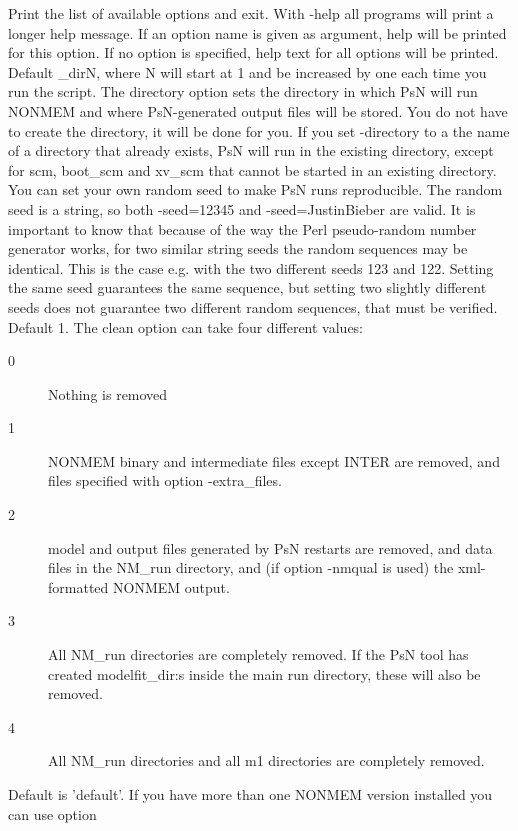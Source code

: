 \begin{optionlist}
Print the list of available options and exit. 
\nextopt
{}
With -help all programs will print a longer help message. 
If an option name is given as argument, help will be printed for this option. 
If no option is specified, help text for all options will be printed. 
\nextopt
{}
Default \guidetoolname\_dirN,
where N will start at 1 and
be increased by one each time you run the script. The directory option sets the directory in which PsN 
will run NONMEM and where PsN-generated output files will be stored. 
You do not have to create the directory,  it will be done for you. If you set
-directory to a the name of a directory that already exists, PsN will run in the existing directory, except
for scm, boot\_scm and xv\_scm that cannot be started in an existing directory.
\nextopt
{}
You can set your own random seed to make PsN runs reproducible.
The random seed is a string, so both -seed=12345 and -seed=JustinBieber are valid.
It is important to know that because of the way the Perl pseudo-random
number generator works, for two similar string seeds the random sequences may be identical. 
This is the case e.g. with the two different seeds 123 and 122. 
Setting the same seed guarantees the same sequence, but setting two slightly different 
seeds does not guarantee two different random sequences, that must be verified.
\nextopt
{}
Default 1. The clean option can take four different values:  
\begin{description}
\item[0] Nothing is removed 
\item[1] NONMEM binary and intermediate files except INTER are removed, and files specified with option -extra\_files. 
\item[2] model and output files generated by PsN restarts are removed, and data files in the NM\_run directory, and (if option -nmqual is used) the xml-formatted NONMEM output. 
\item[3] All NM\_run directories are completely removed. If the PsN tool has created modelfit\_dir:s inside the main run directory, these  will also be removed. 
\item[4] All NM\_run directories and all m1 directories are completely removed.
\end{description}
\nextopt
{}
Default is 'default'. 
If you have more than one NONMEM version installed you can use option

\end{optionlist}
